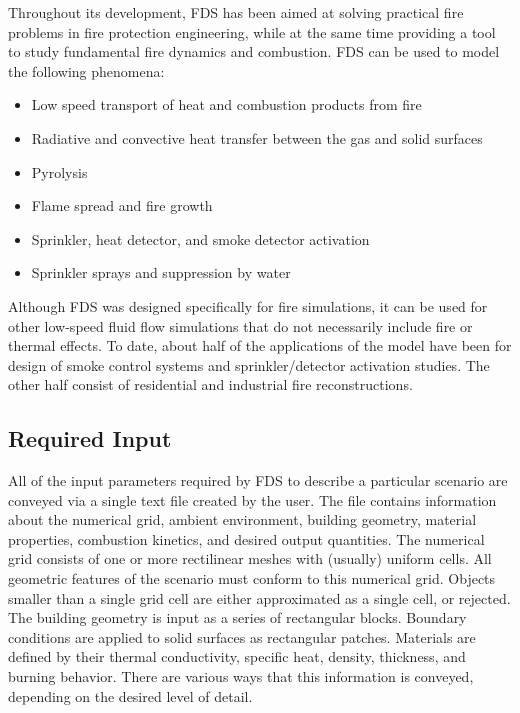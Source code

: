\documentclass[11pt]{book}
\begin{document}
Throughout its development, FDS has been aimed at solving practical
fire problems in fire protection engineering, while at the same time
providing a tool to study fundamental fire dynamics and combustion.
FDS can be used to model the following phenomena:
\begin{itemize}
\setlength{\itemsep}{0.0in}
\item Low speed transport of heat and combustion products from fire
\item Radiative and convective heat transfer between the gas and solid surfaces
\item Pyrolysis
\item Flame spread and fire growth
\item Sprinkler, heat detector, and smoke detector activation
\item Sprinkler sprays and suppression by water
\end{itemize}
Although FDS was designed specifically for fire simulations,
it can be used for other low-speed fluid flow simulations that do not necessarily
include fire or thermal effects. To date, about half of the
applications of the model have been for design of smoke control
systems and sprinkler/detector activation studies.
The other half consist of residential and industrial fire reconstructions.


\subsection{Required Input}

All of the input parameters required by FDS to describe a particular
scenario are conveyed via a single text file created by the user.
The file contains information about the numerical grid, ambient environment, building geometry, material
properties, combustion kinetics, and desired output quantities.
The numerical grid consists of one or more rectilinear meshes with (usually) uniform cells. All geometric features of the
scenario must conform to this numerical grid. Objects smaller than a single grid cell are either approximated
as a single cell, or rejected. The building geometry is input as a series of rectangular blocks. Boundary conditions are
applied to solid surfaces as rectangular patches. Materials are defined by their thermal conductivity, specific heat,
density, thickness, and burning behavior. There are various ways that this information is conveyed, depending on the
desired level of detail.
\end{document}
